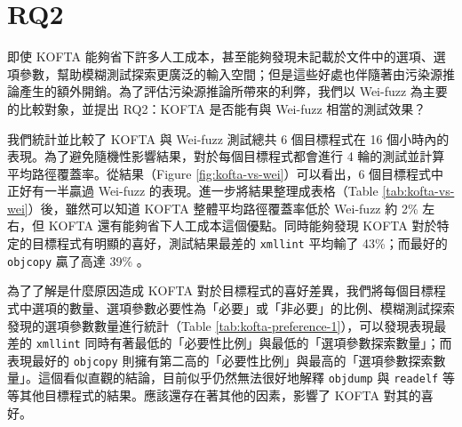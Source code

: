 \section{RQ2}
\label{sec:rq2}

即使 KOFTA 能夠省下許多人工成本，甚至能夠發現未記載於文件中的選項、選項參數，幫助模糊測試探索更廣泛的輸入空間；但是這些好處也伴隨著由污染源推論產生的額外開銷。為了評估污染源推論所帶來的利弊，我們以 Wei-fuzz 為主要的比較對象，並提出 RQ2：KOFTA 是否能有與 Wei-fuzz 相當的測試效果？

我們統計並比較了 KOFTA 與 Wei-fuzz 測試總共 6 個目標程式在 16 個小時內的表現。為了避免隨機性影響結果，對於每個目標程式都會進行 4 輪的測試並計算平均路徑覆蓋率。從結果（Figure \ref{fig:kofta-vs-wei}）可以看出，6 個目標程式中正好有一半贏過 Wei-fuzz 的表現。進一步將結果整理成表格（Table \ref{tab:kofta-vs-wei}）後，雖然可以知道 KOFTA 整體平均路徑覆蓋率低於 Wei-fuzz 約 2\% 左右，但 KOFTA 還有能夠省下人工成本這個優點。同時能夠發現 KOFTA 對於特定的目標程式有明顯的喜好，測試結果最差的 \texttt{xmllint} 平均輸了 43\%；而最好的 \texttt{objcopy} 贏了高達 39\% 。

為了了解是什麼原因造成 KOFTA 對於目標程式的喜好差異，我們將每個目標程式中選項的數量、選項參數必要性為「必要」或「非必要」的比例、模糊測試探索發現的選項參數數量進行統計（Table \ref{tab:kofta-preference-1}），可以發現表現最差的 \texttt{xmllint} 同時有著最低的「必要性比例」與最低的「選項參數探索數量」；而表現最好的 \texttt{objcopy} 則擁有第二高的「必要性比例」與最高的「選項參數探索數量」。這個看似直觀的結論，目前似乎仍然無法很好地解釋 \texttt{objdump} 與  \texttt{readelf} 等等其他目標程式的結果。應該還存在著其他的因素，影響了 KOFTA 對其的喜好。

\vfill

